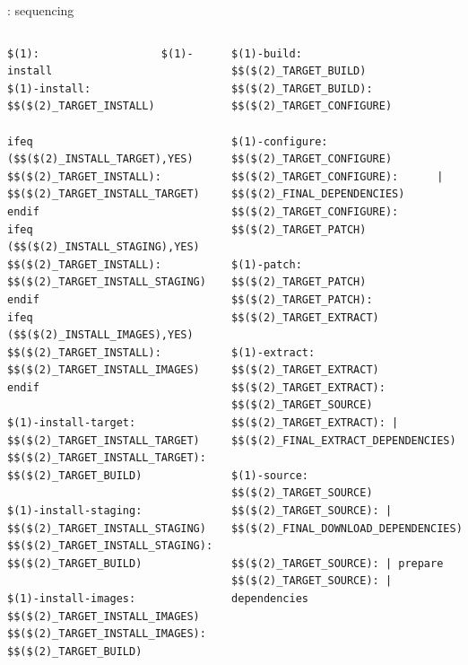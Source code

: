 \begin{frame}[fragile]{: sequencing}

  \begin{columns}
\begin{block}{}
\begin{verbatim}
$(1):                   $(1)-install
$(1)-install:           $$($(2)_TARGET_INSTALL)

ifeq ($$($(2)_INSTALL_TARGET),YES)
$$($(2)_TARGET_INSTALL): $$($(2)_TARGET_INSTALL_TARGET)
endif
ifeq ($$($(2)_INSTALL_STAGING),YES)
$$($(2)_TARGET_INSTALL): $$($(2)_TARGET_INSTALL_STAGING)
endif
ifeq ($$($(2)_INSTALL_IMAGES),YES)
$$($(2)_TARGET_INSTALL): $$($(2)_TARGET_INSTALL_IMAGES)
endif

$(1)-install-target:            $$($(2)_TARGET_INSTALL_TARGET)
$$($(2)_TARGET_INSTALL_TARGET): $$($(2)_TARGET_BUILD)

$(1)-install-staging:			$$($(2)_TARGET_INSTALL_STAGING)
$$($(2)_TARGET_INSTALL_STAGING):	$$($(2)_TARGET_BUILD)

$(1)-install-images:		$$($(2)_TARGET_INSTALL_IMAGES)
$$($(2)_TARGET_INSTALL_IMAGES):	$$($(2)_TARGET_BUILD)
\end{verbatim}
\end{block}
\begin{block}{}
\begin{verbatim}
$(1)-build:             $$($(2)_TARGET_BUILD)
$$($(2)_TARGET_BUILD):  $$($(2)_TARGET_CONFIGURE)

$(1)-configure:                 $$($(2)_TARGET_CONFIGURE)
$$($(2)_TARGET_CONFIGURE):      | $$($(2)_FINAL_DEPENDENCIES)
$$($(2)_TARGET_CONFIGURE):      $$($(2)_TARGET_PATCH)

$(1)-patch:             $$($(2)_TARGET_PATCH)
$$($(2)_TARGET_PATCH):  $$($(2)_TARGET_EXTRACT)

$(1)-extract:                   $$($(2)_TARGET_EXTRACT)
$$($(2)_TARGET_EXTRACT):        $$($(2)_TARGET_SOURCE)
$$($(2)_TARGET_EXTRACT): | $$($(2)_FINAL_EXTRACT_DEPENDENCIES)

$(1)-source:            $$($(2)_TARGET_SOURCE)
$$($(2)_TARGET_SOURCE): | $$($(2)_FINAL_DOWNLOAD_DEPENDENCIES)

$$($(2)_TARGET_SOURCE): | prepare
$$($(2)_TARGET_SOURCE): | dependencies
\end{verbatim}
\end{block}
  \end{columns}
\end{frame}

